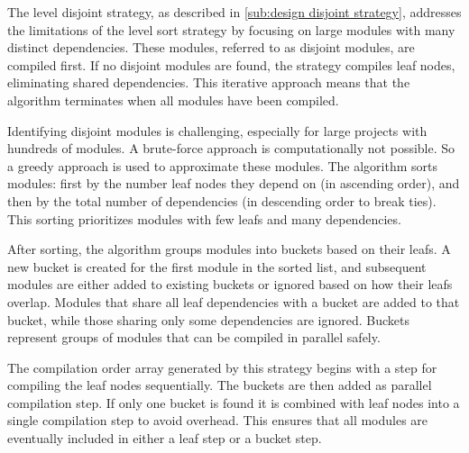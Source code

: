 The level disjoint strategy, as described in \cref{sub:design disjoint strategy}, addresses the limitations of the level sort strategy by focusing on
large modules with many distinct dependencies. These modules, referred to as
disjoint modules, are compiled first. If no disjoint modules are found, the
strategy compiles leaf nodes, eliminating shared dependencies. This iterative
approach means that the algorithm terminates when all modules have been
compiled.


Identifying disjoint modules is challenging, especially for large projects with
hundreds of modules. A brute-force approach is computationally not possible. So
a greedy approach is used to approximate these modules. The algorithm sorts
modules: first by the number leaf nodes they depend on (in ascending order),
and then by the total number of dependencies (in descending order to break
ties). This sorting prioritizes modules with few leafs and  many dependencies.

After sorting, the algorithm groups modules into buckets based on their leafs.
A new bucket is created for the first module in the sorted list, and subsequent
modules are either added to existing buckets or ignored based on how their
leafs overlap. Modules that share all leaf dependencies with a bucket are added
to that bucket, while those sharing only some dependencies are ignored. Buckets
represent groups of modules that can be compiled in parallel safely.

The compilation order array generated by this strategy begins with a step for
compiling the leaf nodes sequentially. The buckets are then added as parallel
compilation step. If only one bucket is found it is combined with leaf nodes
into a single compilation step to avoid overhead. This ensures that all
modules are eventually included in either a leaf step or a bucket step.

